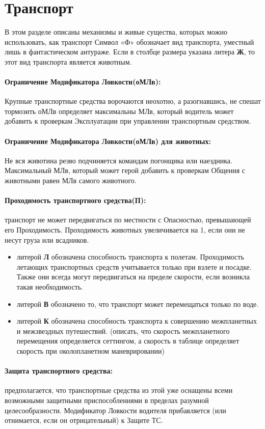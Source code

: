 \section{Транспорт}
В этом разделе описаны механизмы и живые существа, которых можно использовать, как транспорт
\newline Символ «Ф» обозначает вид транспорта, уместный лишь в фантастическом антураже.
\newline Если в столбце размера указана литера \textbf{Ж}, то этот вид транспорта является животным.
\paragraph{Ограничение Модификатора Ловкости(оМЛв):} Крупные транспортные средства ворочаются неохотно, а разогнавшись, не спешат тормозить оМЛв определяет максимальны МЛв, который водитель может добавить к проверкам Эксплуатации при управлении транспортным средством.
\paragraph{Ограничение Модификатора Ловкости(оМЛв) для животных:} Не вся животина резво подчиняется командам погонщика или наездника. Максимальный МЛв, который может герой добавить к проверкам Общения с животными равен МЛв самого животного.
\paragraph{Проходимость транспортного средства(П):} транспорт не может передвигаться по местности с Опасностью, превышающей его Проходимость. Проходимость животных увеличивается на 1, если они не несут груза или всадников.
\begin{itemize}
\item литерой \textbf{Л} обозначена способность транспорта к полетам. Проходимость летающих транспортных средств учитывается только при взлете и посадке. Также они всегда могут передвигаться на пределе скорости, если возникла такая необходимость.
\item литерой \textbf{В} обозначено то, что транспорт может перемещаться только по воде.
\item литерой \textbf{К} обозначена способность транспорта к совершению межпланетных и межзвездных путешествий. \tbd(описать, что скорость межпланетного перемещения определяется сеттингом, а скорость в таблице определяет скорость при околопланетном маневрировании)
\end{itemize}
\paragraph{Защита транспортного средства:} предполагается, что транспортные средства из этой уже оснащены всеми возможными защитными приспособлениями в пределах разумной целесообразности. Модификатор Ловкости водителя прибавляется (или отнимается, если он отрицательный) к Защите ТС.
